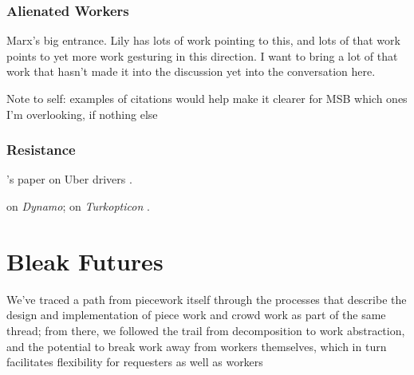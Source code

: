 \documentclass{sigchi}
\begin{document}
\subsubsection{Alienated Workers}
\itshape

Marx's big entrance. Lily has lots of work pointing to this, and
lots of that work points to yet more work gesturing in this direction.
I want to bring a lot of that work
that hasn't made it into the discussion yet
into the conversation here.

Note to self: examples of citations would help make it clearer for MSB which ones I'm overlooking,
if nothing else

\upshape


\subsubsection{Resistance}

\citeauthor{uberAlgorithm}'s paper on Uber drivers
\cite{uberAlgorithm}.

\citeauthor{dynamo} on \textit{Dynamo};
\citeauthor{turkopticon} on \textit{Turkopticon}
\cite{turkopticon,dynamo}.







\section{Bleak Futures}
We've traced a path from piecework itself through
the processes that describe the design and implementation of piece work and crowd work as part of the same thread;
from there, we followed the trail from decomposition to work abstraction,
and the potential to break work away from workers themselves,
which in turn facilitates flexibility for requesters as well as workers
\end{document}
